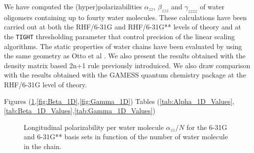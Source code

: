 \documentclass[prl,aps,twocolumn,showpacs,twocolumngrid,superbib]{revtex4}
\begin{document}
We have computed the (hyper)polarizabilities $\alpha_{zz}$, 
$\beta_{zzz}$ and $\gamma_{zzzz}$ of water oligomers containing
up to fourty water molecules. These calculations have been carried out at
both the RHF/6-31G and RHF/6-31G** levels of
theory and at the {\tt TIGHT} thresholding parameter 
that control precision of the linear scaling algorithms.
The static properties of water chains have been evaluated
by using the same geometry as Otto et al \cite{POtto00}. We also
present the results obtained with the density matrix based 2n+1 rule 
previously introduiced.
We also draw comparison with the results obtained with the GAMESS 
quantum chemistry package \cite{gamess} at the RHF/6-31G level of theory.


Figures (\ref{fig:Alpha_1D},\ref{fig:Beta_1D},\ref{fig:Gamma_1D})
Tables (\ref{tab:Alpha_1D_Values},\ref{tab:Beta_1D_Values},\ref{tab:Gamma_1D_Values})


\begin{figure}[t]
  \caption{\protect
    Longitudinal polarizability per water molecule
    $\alpha_{zz}/N$ for 
    the 6-31G and 6-31G** basis sets in function
    of the number of water molecule in the chain.
  }\label{fig:Alpha_1D}
\end{figure}
\end{document}

